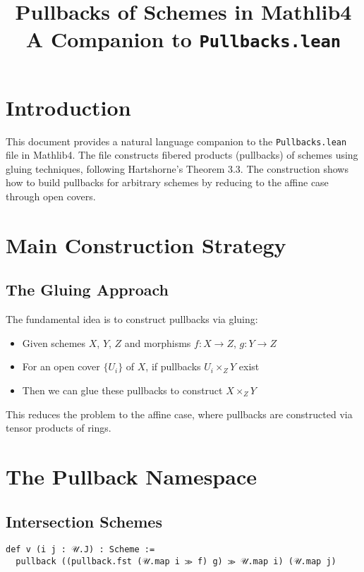 \documentclass{article}
\title{Pullbacks of Schemes in Mathlib4\\
\large A Companion to \texttt{Pullbacks.lean}}
\author{}
\date{}
\theoremstyle{definition}
\begin{document}
\maketitle

\section{Introduction}

This document provides a natural language companion to the \texttt{Pullbacks.lean} file in Mathlib4. The file constructs fibered products (pullbacks) of schemes using gluing techniques, following Hartshorne's Theorem 3.3. The construction shows how to build pullbacks for arbitrary schemes by reducing to the affine case through open covers.

\section{Main Construction Strategy}

\subsection{The Gluing Approach}

The fundamental idea is to construct pullbacks via gluing:
\begin{itemize}
\item Given schemes $X$, $Y$, $Z$ and morphisms $f: X \to Z$, $g: Y \to Z$
\item For an open cover $\{U_i\}$ of $X$, if pullbacks $U_i \times_Z Y$ exist
\item Then we can glue these pullbacks to construct $X \times_Z Y$
\end{itemize}

This reduces the problem to the affine case, where pullbacks are constructed via tensor products of rings.

\section{The Pullback Namespace}

\subsection{Intersection Schemes}

\begin{lstlisting}
def v (i j : 𝒰.J) : Scheme :=
  pullback ((pullback.fst (𝒰.map i ≫ f) g) ≫ 𝒰.map i) (𝒰.map j)
\end{lstlisting}
\end{document}
